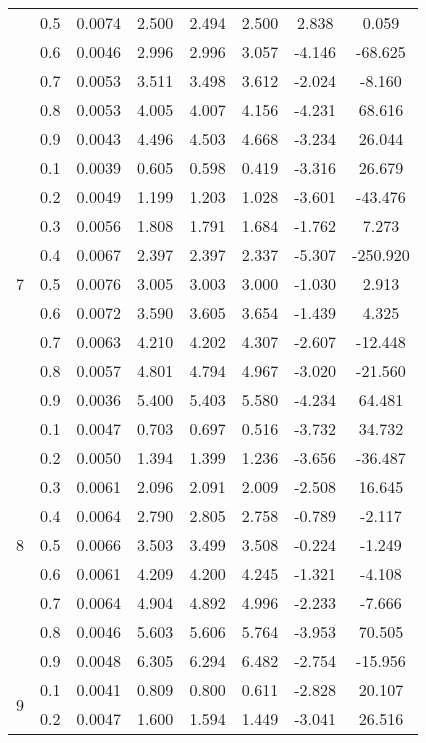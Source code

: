 \documentclass[11pt,a4paper]{report}
\begin{document}
\begin{longtable}{ | c | c || c | c | c | c | c | c | }
 & 0.5 & 0.0074 & 2.500 & 2.494 & 2.500 & 2.838 & 0.059 \\
 & 0.6 & 0.0046 & 2.996 & 2.996 & 3.057 & -4.146 & -68.625 \\
 & 0.7 & 0.0053 & 3.511 & 3.498 & 3.612 & -2.024 & -8.160 \\
 & 0.8 & 0.0053 & 4.005 & 4.007 & 4.156 & -4.231 & 68.616 \\
 & 0.9 & 0.0043 & 4.496 & 4.503 & 4.668 & -3.234 & 26.044 \\
 \hline
\multirow{9}{*}{7} & 0.1 & 0.0039 & 0.605 & 0.598 & 0.419 & -3.316 & 26.679 \\
 & 0.2 & 0.0049 & 1.199 & 1.203 & 1.028 & -3.601 & -43.476 \\
 & 0.3 & 0.0056 & 1.808 & 1.791 & 1.684 & -1.762 & 7.273 \\
 & 0.4 & 0.0067 & 2.397 & 2.397 & 2.337 & -5.307 & -250.920 \\
 & 0.5 & 0.0076 & 3.005 & 3.003 & 3.000 & -1.030 & 2.913 \\
 & 0.6 & 0.0072 & 3.590 & 3.605 & 3.654 & -1.439 & 4.325 \\
 & 0.7 & 0.0063 & 4.210 & 4.202 & 4.307 & -2.607 & -12.448 \\
 & 0.8 & 0.0057 & 4.801 & 4.794 & 4.967 & -3.020 & -21.560 \\
 & 0.9 & 0.0036 & 5.400 & 5.403 & 5.580 & -4.234 & 64.481 \\
 \hline
\multirow{9}{*}{8} & 0.1 & 0.0047 & 0.703 & 0.697 & 0.516 & -3.732 & 34.732 \\
 & 0.2 & 0.0050 & 1.394 & 1.399 & 1.236 & -3.656 & -36.487 \\
 & 0.3 & 0.0061 & 2.096 & 2.091 & 2.009 & -2.508 & 16.645 \\
 & 0.4 & 0.0064 & 2.790 & 2.805 & 2.758 & -0.789 & -2.117 \\
 & 0.5 & 0.0066 & 3.503 & 3.499 & 3.508 & -0.224 & -1.249 \\
 & 0.6 & 0.0061 & 4.209 & 4.200 & 4.245 & -1.321 & -4.108 \\
 & 0.7 & 0.0064 & 4.904 & 4.892 & 4.996 & -2.233 & -7.666 \\
 & 0.8 & 0.0046 & 5.603 & 5.606 & 5.764 & -3.953 & 70.505 \\
 & 0.9 & 0.0048 & 6.305 & 6.294 & 6.482 & -2.754 & -15.956 \\
 \hline
\multirow{9}{*}{9} & 0.1 & 0.0041 & 0.809 & 0.800 & 0.611 & -2.828 & 20.107 \\
 & 0.2 & 0.0047 & 1.600 & 1.594 & 1.449 & -3.041 & 26.516 \\

\end{longtable}
\end{document}
